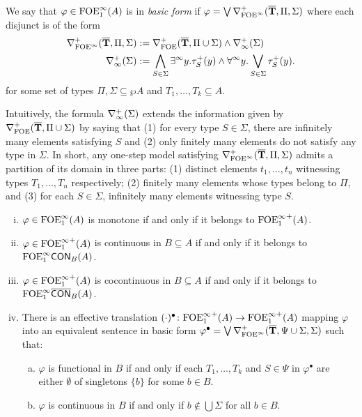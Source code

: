 \begin{definition}
We say that $\varphi \in \ofoei(A)$ is in \emph{basic form} if $\varphi = \bigvee \posdbnfofoei{\vlist{T}}{\Pi}{\Sigma}$ where each disjunct is of the form
\begin{align*}
	\posdbnfofoei{\vlist{T}}{\Pi}{\Sigma} &:= \posdbnfofoe{\vlist{T}}{\Pi \cup \Sigma} \land \posdbnfinf{\Sigma}\\
	\posdbnfinf{\Sigma} &:= \bigwedge_{S\in\Sigma} \qu y.\tau^{+}_S(y) \land \dqu y.\bigvee_{S\in\Sigma} \tau^{+}_S(y) .
\end{align*}
for some set of types $\Pi,\Sigma \subseteq \wp A$ and $T_1, \dots, T_k \subseteq A$.
\end{definition}

Intuitively, the formula $\posdbnfinf{\Sigma}$ extends the information given by $\posdbnfofoe{\vlist{T}}{\Pi \cup \Sigma}$ by saying that (1) for every type $S\in\Sigma$, there are infinitely many elements satisfying $S$ and (2) only finitely many elements do not satisfy any type in $\Sigma$. In short, any one-step model satisfying $\posdbnfofoei{\vlist{T}}{\Pi}{\Sigma}$ admits a partition of its domain in three parts: (1) distinct elements $t_1,\dots,t_n$ witnessing types $T_1,\dots,T_n$ respectively; (2) finitely many elements whose types belong to $\Pi$, and (3) for each $S\in \Sigma$, infinitely many elements witnessing type $S$.


\begin{theorem}\label{th:ofoei-normalforms} 
\begin{enumerate}[(i)]
\item $\varphi  \in \ofoei(A)$ is monotone if and only if it belongs to ${\ofoei}^{+}(A)$. 
\item $\varphi  \in {\ofoei}^{+}(A)$ is continuous in $B \subseteq A$ if and only if it belongs to $\cont{\ofoei}{B}(A)$. 
\item $\varphi  \in {\ofoei}^{+}(A)$ is cocontinuous in $B \subseteq A$ if and only if it belongs to $\cocont{\ofoei}{B}(A)$. 
\item There is an effective translation $(\cdot)^{\bullet} \: {\ofoei}^{+}(A) \to {\ofoei}^{+}(A)$ mapping $\varphi$ into an equivalent sentence in basic form $\varphi^{\bullet} = \bigvee \mondbnfofoei{\vlist{T}}{\Psi \cup \Sigma}{\Sigma}{+}$ such that:
\begin{enumerate}[(a)]
\item $\varphi$ is functional in $B$ if and only if each $T_1, \dots, T_k$ and $S \in \Psi$ in $\varphi^{\bullet}$ are either $\emptyset$ of singletons $\{b\}$ for some $b \in B$.
\item $\varphi$ is continuous in $B$ if and only if $b\notin \bigcup\Sigma$ for all $b \in B$.
\end{enumerate}
\end{enumerate}
\end{theorem}

